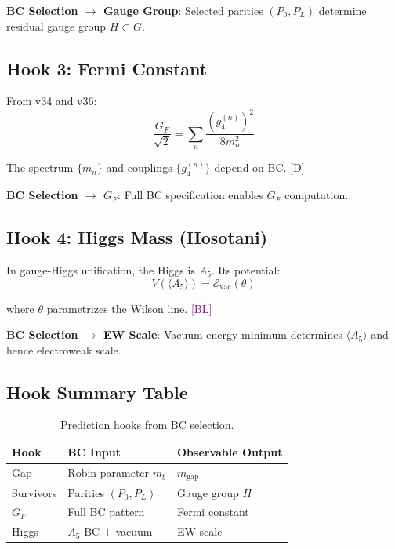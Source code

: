 \documentclass[11pt,a4paper]{article}
\newcommand{\tagD}{\textcolor{blue!70!black}{[D]}}
\newcommand{\tagBL}{\textcolor{purple}{[BL]}}
\begin{document}
\textbf{BC Selection $\to$ Gauge Group}: Selected parities $(P_0, P_L)$ determine
residual gauge group $H \subset G$.

\subsection{Hook 3: Fermi Constant}

From v34 and v36:
\begin{equation}
\label{eq:hook-GF}
\frac{G_F}{\sqrt{2}} = \sum_n \frac{(g_4^{(n)})^2}{8 m_n^2}
\end{equation}

The spectrum $\{m_n\}$ and couplings $\{g_4^{(n)}\}$ depend on BC. \tagD

\textbf{BC Selection $\to$ $G_F$}: Full BC specification enables $G_F$ computation.

\subsection{Hook 4: Higgs Mass (Hosotani)}

In gauge-Higgs unification, the Higgs is $A_5$. Its potential:
\begin{equation}
\label{eq:hook-higgs}
V(\langle A_5 \rangle) = \mathcal{E}_{\text{vac}}(\theta)
\end{equation}

where $\theta$ parametrizes the Wilson line. \tagBL

\textbf{BC Selection $\to$ EW Scale}: Vacuum energy minimum determines
$\langle A_5 \rangle$ and hence electroweak scale.

\subsection{Hook Summary Table}

\begin{table}[h]
\centering
\begin{tabular}{lll}
\toprule
Hook & BC Input & Observable Output \\
\midrule
Gap & Robin parameter $m_b$ & $m_{\text{gap}}$ \\
Survivors & Parities $(P_0, P_L)$ & Gauge group $H$ \\
$G_F$ & Full BC pattern & Fermi constant \\
Higgs & $A_5$ BC + vacuum & EW scale \\
\bottomrule
\end{tabular}
\caption{Prediction hooks from BC selection.}
\label{tab:hooks}
\end{table}
\end{document}
